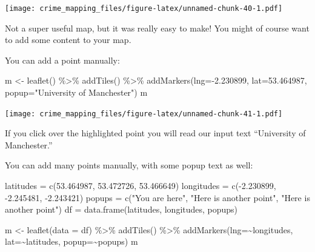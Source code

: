 \documentclass[
]{book}
\newenvironment{Shaded}{\begin{snugshade}}{\end{snugshade}}
\newcommand{\AttributeTok}[1]{\textcolor[rgb]{0.77,0.63,0.00}{#1}}
\newcommand{\FloatTok}[1]{\textcolor[rgb]{0.00,0.00,0.81}{#1}}
\newcommand{\FunctionTok}[1]{\textcolor[rgb]{0.00,0.00,0.00}{#1}}
\newcommand{\NormalTok}[1]{#1}
\newcommand{\OtherTok}[1]{\textcolor[rgb]{0.56,0.35,0.01}{#1}}
\newcommand{\SpecialCharTok}[1]{\textcolor[rgb]{0.00,0.00,0.00}{#1}}
\newcommand{\StringTok}[1]{\textcolor[rgb]{0.31,0.60,0.02}{#1}}
\begin{document}
\texttt{[image: crime\_mapping\_files/figure-latex/unnamed-chunk-40-1.pdf]}

Not a super useful map, but it was really easy to make! You might of course want to add some content to your map.

You can add a point manually:

\begin{Shaded}
\begin{Highlighting}[]
\NormalTok{m }\OtherTok{\textless{}{-}} \FunctionTok{leaflet}\NormalTok{() }\SpecialCharTok{\%\textgreater{}\%}
  \FunctionTok{addTiles}\NormalTok{()  }\SpecialCharTok{\%\textgreater{}\%} 
  \FunctionTok{addMarkers}\NormalTok{(}\AttributeTok{lng=}\SpecialCharTok{{-}}\FloatTok{2.230899}\NormalTok{, }\AttributeTok{lat=}\FloatTok{53.464987}\NormalTok{, }\AttributeTok{popup=}\StringTok{"University of Manchester"}\NormalTok{)}
\NormalTok{m  }
\end{Highlighting}
\end{Shaded}

\texttt{[image: crime\_mapping\_files/figure-latex/unnamed-chunk-41-1.pdf]}

If you click over the highlighted point you will read our input text ``University of Manchester.''

You can add many points manually, with some popup text as well:

\begin{Shaded}
\begin{Highlighting}[]
\NormalTok{latitudes }\OtherTok{=} \FunctionTok{c}\NormalTok{(}\FloatTok{53.464987}\NormalTok{, }\FloatTok{53.472726}\NormalTok{, }\FloatTok{53.466649}\NormalTok{) }
\NormalTok{longitudes }\OtherTok{=} \FunctionTok{c}\NormalTok{(}\SpecialCharTok{{-}}\FloatTok{2.230899}\NormalTok{, }\SpecialCharTok{{-}}\FloatTok{2.245481}\NormalTok{, }\SpecialCharTok{{-}}\FloatTok{2.243421}\NormalTok{) }
\NormalTok{popups }\OtherTok{=} \FunctionTok{c}\NormalTok{(}\StringTok{"You are here"}\NormalTok{, }\StringTok{"Here is another point"}\NormalTok{, }\StringTok{"Here is another point"}\NormalTok{) }
\NormalTok{df }\OtherTok{=} \FunctionTok{data.frame}\NormalTok{(latitudes, longitudes, popups)      }

\NormalTok{m }\OtherTok{\textless{}{-}} \FunctionTok{leaflet}\NormalTok{(}\AttributeTok{data =}\NormalTok{ df) }\SpecialCharTok{\%\textgreater{}\%}
  \FunctionTok{addTiles}\NormalTok{()  }\SpecialCharTok{\%\textgreater{}\%}  
  \FunctionTok{addMarkers}\NormalTok{(}\AttributeTok{lng=}\SpecialCharTok{\textasciitilde{}}\NormalTok{longitudes, }\AttributeTok{lat=}\SpecialCharTok{\textasciitilde{}}\NormalTok{latitudes, }\AttributeTok{popup=}\SpecialCharTok{\textasciitilde{}}\NormalTok{popups)}
\NormalTok{m  }
\end{Highlighting}
\end{Shaded}
\end{document}
